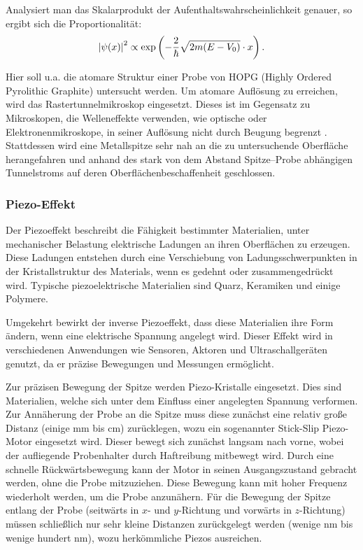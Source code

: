 \documentclass{article}
\newcommand{\defc}{black}
\newcommand{\colorT}[2][blue]{\color{#1}{#2}\color{\defc}}
\newcommand{\todo}[1]{\colorT[red]{\textbf{(#1)}}}
\begin{document}
Analysiert man das Skalarprodukt der Aufenthaltswahrscheinlichkeit genauer, so ergibt sich die Proportionalität:
\begin{align*}
    \abs{\psi(x)}^2 \propto \exp\left(-\frac{2}{\hbar} \sqrt{2m (E - V_0)} \cdot x\right).
\end{align*}

Hier soll u.a. die atomare Struktur einer Probe von HOPG (Highly Ordered Pyrolithic Graphite) untersucht werden. Um atomare Auflösung zu erreichen, wird das Rastertunnelmikroskop eingesetzt. Dieses ist im Gegensatz zu Mikroskopen, die Welleneffekte verwenden, wie optische oder Elektronenmikroskope,
in seiner Auflösung nicht durch Beugung begrenzt \todo{Quelle?}.
Stattdessen wird eine Metallspitze sehr nah an die zu untersuchende Oberfläche 
herangefahren und anhand des stark von dem Abstand Spitze--Probe abhängigen Tunnelstroms auf deren Oberflächenbeschaffenheit geschlossen.

\subsubsection*{Piezo-Effekt}
Der Piezoeffekt beschreibt die Fähigkeit bestimmter Materialien, unter mechanischer Belastung elektrische Ladungen an ihren Oberflächen zu erzeugen. Diese Ladungen entstehen durch eine Verschiebung von Ladungsschwerpunkten in der Kristallstruktur des Materials, wenn es gedehnt oder zusammengedrückt wird. Typische piezoelektrische Materialien sind Quarz, Keramiken und einige Polymere.

Umgekehrt bewirkt der inverse Piezoeffekt, dass diese Materialien ihre Form ändern, wenn eine elektrische Spannung angelegt wird. Dieser Effekt wird in verschiedenen Anwendungen wie Sensoren, Aktoren und Ultraschallgeräten genutzt, da er präzise Bewegungen und Messungen ermöglicht.

Zur präzisen Bewegung der Spitze werden Piezo-Kristalle eingesetzt. 
Dies sind Materialien, welche sich unter dem Einfluss einer angelegten Spannung
verformen. Zur Annäherung der Probe an die Spitze muss diese zunächst eine relativ 
große Distanz (einige \si{\mm} bis \si{cm}) zurücklegen, wozu ein sogenannter Stick-Slip
Piezo-Motor eingesetzt wird. Dieser bewegt sich zunächst langsam nach vorne, wobei
der aufliegende Probenhalter durch Haftreibung mitbewegt wird. Durch eine schnelle
Rückwärtsbewegung kann der Motor in seinen Ausgangszustand gebracht werden, ohne die
Probe mitzuziehen. Diese Bewegung kann mit hoher Frequenz wiederholt werden, um die Probe anzunähern.
Für die Bewegung der Spitze entlang der Probe (seitwärts in $x$- und $y$-Richtung und
vorwärts in $z$-Richtung) müssen schließlich nur sehr kleine Distanzen zurückgelegt
werden (wenige \si{nm} bis wenige hundert \si{\nm}), wozu herkömmliche Piezos ausreichen.
\end{document}
